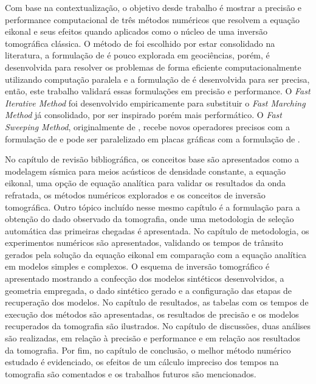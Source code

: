 Com base na contextualização, o objetivo desde trabalho é mostrar a precisão e performance computacional de três métodos numéricos que resolvem a equação eikonal e seus efeitos quando aplicados como o núcleo de uma inversão tomográfica clássica. O método de  foi escolhido por estar consolidado na literatura, a formulação de  é pouco explorada em geociências, porém, é desenvolvida para resolver os problemas de forma eficiente computacionalmente utilizando computação paralela e a formulação de  é desenvolvida para ser precisa, então, este trabalho validará essas formulações em precisão e performance. O \textit{Fast Iterative Method} \cite{jeong2008fast} foi desenvolvido empiricamente para substituir o \textit{Fast Marching Method} \cite{sethian19993} já consolidado, por ser inspirado porém mais performático. O \textit{Fast Sweeping Method}, originalmente de , recebe novos operadores precisos com a formulação de  e pode ser paralelizado em placas gráficas com a formulação de .
 
No capítulo de revisão bibliográfica, os conceitos base são apresentados como a modelagem sísmica para meios acústicos de densidade constante, a equação eikonal, uma opção de equação analítica para validar os resultados da onda refratada, os métodos numéricos explorados e os conceitos de inversão tomográfica. Outro tópico incluído nesse mesmo capítulo é a formulação para a obtenção do dado observado da tomografia, onde uma metodologia de seleção automática das primeiras chegadas é apresentada. No capítulo de metodologia, os experimentos numéricos são apresentados, validando os tempos de trânsito gerados pela solução da equação eikonal em comparação com a equação analítica em modelos simples e complexos. O esquema de inversão tomográfico é apresentado mostrando a confecção dos modelos sintéticos desenvolvidos, a geometria empregada, o dado sintético gerado e a configuração das etapas de recuperação dos modelos. No capítulo de resultados, as tabelas com os tempos de execução dos métodos são apresentadas, os resultados de precisão e os modelos recuperados da tomografia são ilustrados. No capítulo de discussões, duas análises são realizadas, em relação à precisão e performance e em relação aos resultados da tomografia. Por fim, no capítulo de conclusão, o melhor método numérico estudado é evidenciado, os efeitos de um cálculo impreciso dos tempos na tomografia são comentados e os trabalhos futuros são mencionados.

